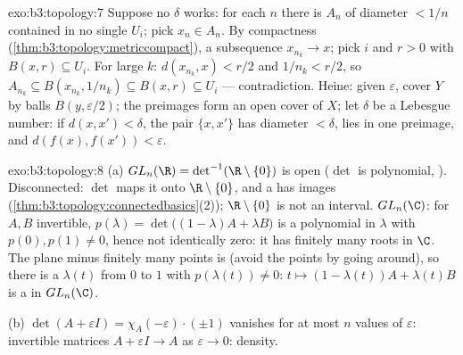 \begin{solution}{exo:b3:topology:7}
Suppose no $\delta$ works: for each $n$ there is $A_n$ of
diameter $< 1/n$ contained in no single $U_i$; pick $x_n \in
A_n$. By compactness (\cref{thm:b3:topology:metriccompact}),
a subsequence $x_{n_k} \to x$; pick $i$ and $r > 0$ with $B(x,
r) \subseteq U_i$. For large $k$: $d(x_{n_k}, x) < r/2$ and
$1/n_k < r/2$, so $A_{n_k} \subseteq B(x_{n_k}, 1/n_k)
\subseteq B(x, r) \subseteq U_i$ --- contradiction. Heine:
given $\varepsilon$, cover $Y$ by balls $B(y, \varepsilon/2)$;
the preimages form an open cover of $X$; let $\delta$ be a
Lebesgue number: if $d(x, x') < \delta$, the pair $\{x, x'\}$
has diameter $< \delta$, lies in one preimage, and $d(f(x),
f(x')) < \varepsilon$.
\end{solution}

\begin{solution}{exo:b3:topology:8}
(a) $GL_n(\R) = \det^{-1}(\R\setminus\{0\})$ is open ($\det$ is
polynomial, ). Disconnected: $\det$ maps it onto
$\R\setminus\{0\}$, and a  has 
 images (\cref{thm:b3:topology:connectedbasics}(2));
$\R\setminus\{0\}$ is not an interval. $GL_n(\C)$: for $A, B$
invertible, $p(\lambda) = \det\bigl((1-\lambda)A + \lambda
B\bigr)$ is a polynomial in $\lambda$ with $p(0), p(1) \neq 0$,
hence not identically zero: it has finitely many roots in $\C$.
The plane minus finitely many points is  (avoid
the points by going around), so there is a  $\lambda(t)$
from $0$ to $1$ with $p(\lambda(t)) \neq 0$: $t \mapsto
(1-\lambda(t))A + \lambda(t)B$ is a  in $GL_n(\C)$.

(b) $\det(A + \varepsilon I) = \chi_A(-\varepsilon)\cdot(\pm1)$
vanishes for at most $n$ values of $\varepsilon$: invertible
matrices $A + \varepsilon I \to A$ as $\varepsilon \to 0$:
density.
\end{solution}

